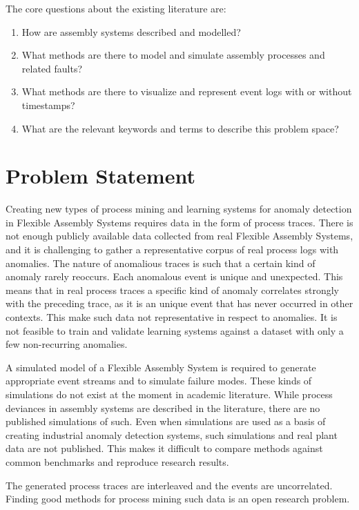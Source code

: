 \documentclass[a4paper,12pt]{article}
\begin{document}
The core questions about the existing literature are:
\begin{enumerate}
 \item How are assembly systems described and modelled?
 \item What methods are there to model and simulate assembly processes and related faults?
 \item What methods are there to visualize and represent event logs with or without timestamps?
 \item What are the relevant keywords and terms to describe this problem space?
\end{enumerate}

\section{Problem Statement}

Creating new types of process mining and learning systems for anomaly detection in Flexible Assembly Systems requires data in the form of process traces.
There is not enough publicly available data collected from real Flexible Assembly Systems, and it is challenging to gather a representative corpus of real process logs with anomalies.
The nature of anomalious traces is such that a certain kind of anomaly rarely reoccurs. Each anomalous event is unique and unexpected. This means
that in real process traces a specific kind of anomaly correlates strongly with the preceding trace, as it is an unique event that has never occurred in other contexts.
This make such data not representative in respect to anomalies. It is not feasible to train and validate learning systems against a dataset with only a few non-recurring anomalies.

A simulated model of a Flexible Assembly System is required to generate appropriate event streams and to simulate failure modes. These kinds of simulations
do not exist at the moment in academic literature. While process deviances in assembly systems are described in the literature, there are no published simulations of such.
Even when simulations are used as a basis of creating industrial anomaly detection systems, such simulations and real plant data are not published\cite{matarese2013procedure}.
This makes it difficult to compare methods against common benchmarks and reproduce research results.

The generated process traces are interleaved and the events are uncorrelated. Finding good methods for process mining such data is an open research problem.
\end{document}
